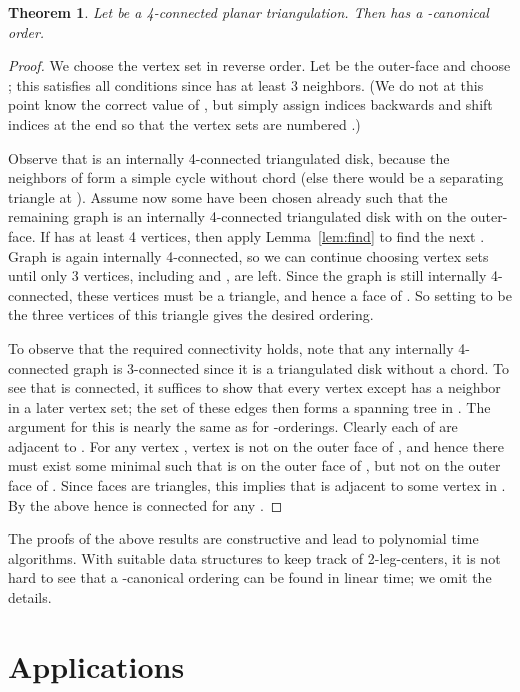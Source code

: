 \documentclass[12pt]{article}
\newtheorem{theorem}{Theorem}
\begin{document}
\begin{theorem}
Let  be a 4-connected planar triangulation. 
Then  has a -canonical order.
\end{theorem}
\begin{proof}
We choose the vertex set in reverse order.    Let  be
the outer-face and choose ; this satisfies all conditions
since  has at least 3 neighbors.  (We do not at this point know the
correct value of , but simply assign indices backwards and shift
indices at the end so that the vertex sets are numbered .)

Observe that 
is an internally 4-connected triangulated disk, because the neighbors
of  form a simple cycle without chord (else there would be a separating
triangle at ).
Assume now some  have been chosen already such that
the remaining graph  is an
internally 4-connected triangulated disk with  on the outer-face.
If  has at least 4 vertices, then apply Lemma~\ref{lem:find} to find the next 
.  
Graph  is again internally 4-connected, so 
we can continue choosing vertex sets until only 3 vertices, including
 and , are left.
Since the graph is still internally 4-connected, these vertices must
be a triangle, and hence a face of .  So setting  to be the
three vertices of this triangle gives the desired ordering.

To observe that the required connectivity holds, note that any
internally 4-connected graph is 3-connected since it is a
triangulated disk without a chord.  To see that 
is connected, it suffices to show that every vertex except 
has a neighbor in a later vertex set; the set of these edges
then forms a spanning tree in .  The argument for
this is nearly the same as for -orderings.  Clearly 
each of  are adjacent to .  For any vertex ,
vertex  is not on the outer face of , and hence there must
exist some minimal  such that  is on the outer face of
, but not on the outer face of .  Since faces
are triangles, this implies that  is adjacent to some vertex
in .  By the above hence  is connected for
any .
\end{proof}


The proofs of the above results are constructive and lead
to polynomial time algorithms.  With suitable data structures
to keep track of 2-leg-centers, it is not hard to see that 
a -canonical ordering can be found in linear time; we
omit the details.

\section{Applications}
\label{se:appl}
\end{document}
